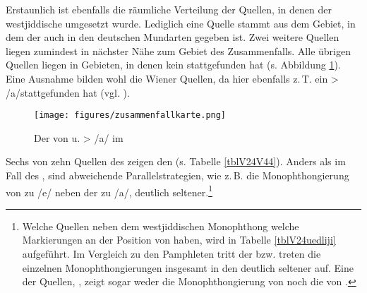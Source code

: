  Erstaunlich ist ebenfalls die räumliche Verteilung der Quellen, in denen der westjiddische  umgesetzt wurde. Lediglich eine Quelle stammt aus dem Gebiet, in dem der  auch in den deutschen Mundarten gegeben ist. Zwei weitere Quellen liegen zumindest in nächster Nähe zum Gebiet des Zusammenfalls. Alle übrigen Quellen liegen in Gebieten, in denen kein  stattgefunden hat (s. Abbildung \ref{karteV24V44}). Eine Ausnahme bilden wohl die Wiener Quellen, da hier ebenfalls z.\,T. ein  > /a\textlengthmark/stattgefunden hat (vgl. \cite[233, 235]{Schirmunski1962}).\\
 
 \begin{figure}[h!]
		\centering
\texttt{[image: figures/zusammenfallkarte.png]}
		\caption{\label{karteV24V44}  Der  von  u.  > /a\textlengthmark/ im }
		\end{figure}
\FloatBarrier
 
Sechs von zehn Quellen des  zeigen den  (s. Tabelle \ref{tblV24V44}). Anders als im Fall des , sind abweichende Parallelstrategien, wie z.\,B. die Monophthongierung von  zu /e\textlengthmark/ neben der zu /a\textlengthmark/, deutlich seltener.\footnote{Welche Quellen neben dem westjiddischen Monophthong welche Markierungen an der Position von  haben, wird in Tabelle \ref{tblV24uedliji} aufgeführt. Im Vergleich zu den Pamphleten tritt der  bzw. treten die einzelnen Monophthongierungen insgesamt in den  deutlich seltener auf. Eine der Quellen, , zeigt sogar weder die Monophthongierung von  noch die von .}\\ %
 
